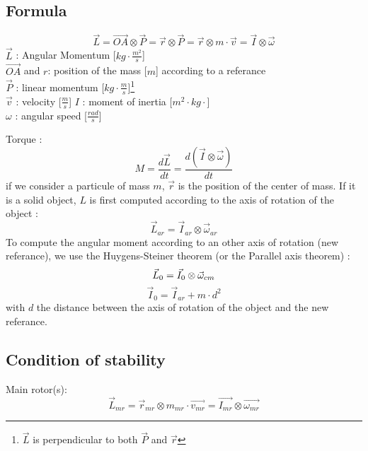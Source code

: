 \documentclass[12pt,a4paper]{article}
\begin{document}
\subsection{Formula}
\begin{equation}
\vec{L}=\vec{OA} \otimes \vec{P}=\vec{r} \otimes \vec{P}=\vec{r} \otimes m \cdot \vec{v}=\vec{I} \otimes \vec{\omega}
\end{equation}
$\vec{L}$ : Angular Momentum [$kg \cdot \frac{m^2}{s}$]\\
$\vec{OA}$ and $r$: position of the mass [$m$] according to a referance\\
$\vec{P}$ : linear momentum [$kg\cdot \frac{m}{s}$]\footnote{$\vec{L}$ is perpendicular to both $\vec{P}$ and $\vec{r}$}\\
$\vec{v}$ : velocity [$\frac{m}{s}$]
$I$ : moment of inertia [$m^2 \cdot kg \cdot$]\\
$\omega$ : angular speed [$\frac{rad}{s}$]

Torque : 
\begin{equation}
M = \frac{d\vec{L}}{dt}=\frac{d(\vec{I} \otimes \vec{\omega})}{dt}
\end{equation}
\medbreak
if we consider a particule of mass $m$, $\vec{r}$ is the position of the center of mass.
If it is a solid object, $L$ is first computed according to the axis of rotation of the object : 
\begin{equation}
\vec{L}_{ar}=\vec{I}_{ar} \otimes \vec{\omega}_{ar}
\end{equation}
To compute the angular moment according to an other axis of rotation (new referance), we use the Huygens-Steiner theorem (or the Parallel axis theorem) : 
\begin{equation}
\vec{L}_{0}=\vec{I}_{0} \otimes \vec{\omega}_{cm}\\
\end{equation}
\begin{equation}
\vec{I}_{0} = \vec{I}_{ar} + m\cdot d^2
\end{equation}
with $d$ the distance between the axis of rotation of the object and the new referance. 
\subsection{Condition of stability}

Main rotor(s):
\begin{equation}
\vec{L}_{mr}=\vec{r}_{mr} \otimes m_{mr} \cdot \vec{v_{mr}}=\vec{I_{mr}} \otimes \vec{\omega_{mr}}
\end{equation}
\end{document}
